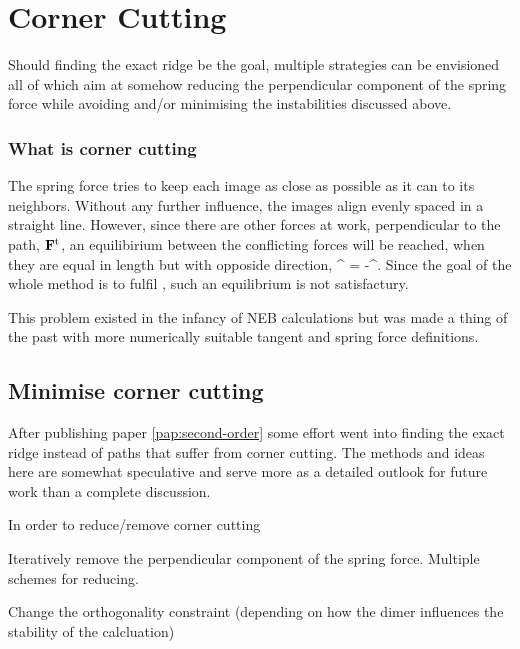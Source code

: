 \section{Corner Cutting}
\label{sec:erm-corner-cutting}




Should finding the exact ridge be the goal, multiple strategies can be envisioned all of which aim at somehow reducing the perpendicular component of the spring force while avoiding and/or minimising the instabilities discussed above.

\subsubsection{What is corner cutting}
The spring force tries to keep each image as close as possible as it can to its neighbors.
Without any further influence, the images align evenly spaced in a straight line.
However, since there are other forces at work, perpendicular to the path, ${\mathrm{\mathbf{\bm{F}}}}^\text{t}$, an equilibirium between the conflicting forces will be reached, when they are equal in length but with opposide direction,
\vF^{\perp} = -\vF^.
\eeq
Since the goal of the whole method is to fulfil , such an equilibrium is not satisfactury.

This problem existed in the infancy of NEB calculations but was made a thing of the past with more numerically suitable tangent and spring force definitions.~\cite{neb-tangent-2000}


\subsection{Minimise corner cutting}
After publishing paper \ref{pap:second-order} some effort went into finding the exact ridge instead of paths that suffer from corner cutting.
The methods and ideas here are somewhat speculative and serve more as a detailed outlook for future work than a complete discussion.

In order to reduce/remove corner cutting 


\bit
\item Iteratively remove the perpendicular component of the spring force. Multiple schemes for reducing.
\item Change the orthogonality constraint (depending on how the dimer influences the stability of the calcluation)
\eit

